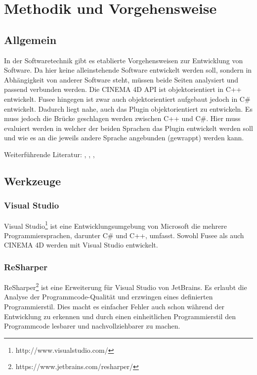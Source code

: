 \section{Methodik und Vorgehensweise}

\subsection{Allgemein}
In der Softwaretechnik gibt es etablierte Vorgehensweisen zur Entwicklung von Software. Da hier keine alleinstehende Software entwickelt werden soll, sondern in Abhängigkeit von anderer Software steht, müssen beide Seiten analysiert und passend verbunden werden. Die CINEMA 4D API ist objektorientiert in C++ entwickelt. Fusee hingegen ist zwar auch objektorientiert aufgebaut jedoch in C\# entwickelt. Dadurch liegt nahe, auch das Plugin objektorientiert zu entwickeln. Es muss jedoch die Brücke geschlagen werden zwischen C++ und C\#. Hier muss evaluiert werden in welcher der beiden Sprachen das Plugin entwickelt werden soll und wie es an die jeweils andere Sprache angebunden (gewrappt) werden kann.

Weiterführende Literatur: \cite{Forbrig.2006}, \cite{Buschmann.c2007}, \cite{Gamma.2004}, \cite{Balzert.2001}

\subsection{Werkzeuge}

\subsubsection{Visual Studio}
Visual Studio\footnote{http://www.visualstudio.com/} ist eine Entwicklungsumgebung von Microsoft die mehrere Programmiersprachen, darunter C\# und C++, umfasst. Sowohl Fusee als auch CINEMA 4D werden mit Visual Studio entwickelt.

\subsubsection{ReSharper}
ReSharper\footnote{https://www.jetbrains.com/resharper/} ist eine Erweiterung für Visual Studio von JetBrains. Es erlaubt die Analyse der Programmcode-Qualität und erzwingen eines definierten Programmierstil. Dies macht es einfacher Fehler auch schon während der Entwicklung zu erkennen und durch einen einheitlichen Programmierstil den Programmcode lesbarer und nachvollziehbarer zu machen.

